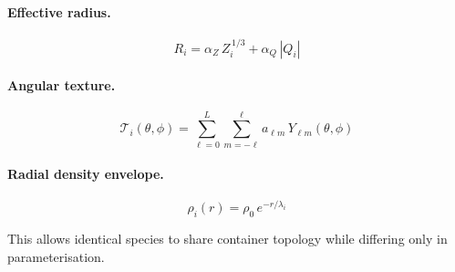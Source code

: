 \documentclass[11pt, a4paper, oneside]{article}
\theoremstyle{definition}
\theoremstyle{remark}
\begin{document}
\paragraph{Effective radius.}

\begin{equation}
  R_i = \alpha_Z \, Z_i^{\,1/3} + \alpha_Q \, |Q_i|
  \label{eq:effective-radius}
\end{equation}

\paragraph{Angular texture.}

\begin{equation}
  \mathcal{T}_i(\theta,\phi) =
  \sum_{\ell=0}^{L}
  \sum_{m=-\ell}^{\ell}
  a_{\ell m}\, Y_{\ell m}(\theta,\phi)
  \label{eq:angular-texture}
\end{equation}

\paragraph{Radial density envelope.}

\begin{equation}
  \rho_i(r) = \rho_0 \, e^{-r/\lambda_i}
  \label{eq:radial-density}
\end{equation}

This allows identical species to share container topology while
differing only in parameterisation.
\end{document}
